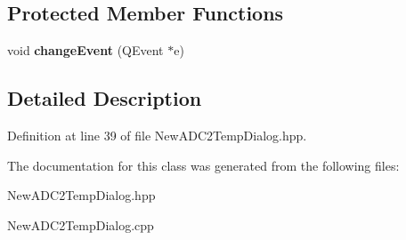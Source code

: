 \subsection*{Protected Member Functions}
\begin{DoxyCompactItemize}
\item 
\mbox{\label{class_new_a_d_c2_temp_dialog_ad134682522a39b4843feae7662574ace}} 
void {\bfseries change\+Event} (Q\+Event $\ast$e)
\end{DoxyCompactItemize}


\subsection{Detailed Description}


Definition at line 39 of file New\+A\+D\+C2\+Temp\+Dialog.\+hpp.



The documentation for this class was generated from the following files\+:\begin{DoxyCompactItemize}
\item 
New\+A\+D\+C2\+Temp\+Dialog.\+hpp\item 
New\+A\+D\+C2\+Temp\+Dialog.\+cpp\end{DoxyCompactItemize}
